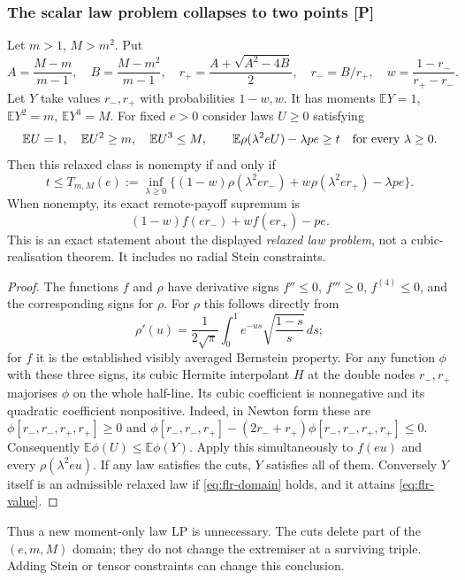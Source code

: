 \subsubsection{The scalar law problem collapses to two points [P]}
Let $m>1$, $M>m^2$. Put
\[
 A=\frac{M-m}{m-1},\quad B=\frac{M-m^2}{m-1},\quad
 r_+=\frac{A+\sqrt{A^2-4B}}2,\quad r_-=B/r_+,
 \quad w=\frac{1-r_-}{r_+-r_-}.
\]
Let $Y$ take values $r_-,r_+$ with probabilities $1-w,w$.
It has moments $\mathbb EY=1$, $\mathbb EY^2=m$, $\mathbb EY^3=M$.
For fixed $e>0$ consider laws $U\ge0$ satisfying
\[
 \mathbb EU=1,\quad\mathbb EU^2\ge m,\quad\mathbb EU^3\le M,
 \qquad \mathbb E\rho(\lambda^2eU)-\lambda pe\ge t
 \quad\hbox{for every }\lambda\ge0.
\]
Then this relaxed class is nonempty if and only if
\begin{equation}\label{eq:flr-domain}
 t\le T_{m,M}(e):=\inf_{\lambda\ge0}
 \{(1-w)\rho(\lambda^2er_-)+w\rho(\lambda^2er_+)-\lambda pe\}.
\end{equation}
When nonempty, its exact remote-payoff supremum is
\begin{equation}\label{eq:flr-value}
 (1-w)f(er_-)+wf(er_+)-pe.
\end{equation}
This is an exact statement about the displayed \emph{relaxed law problem},
not a cubic-realisation theorem. It includes no radial Stein constraints.

\begin{proof}
The functions $f$ and $\rho$ have derivative signs
$f''\le0$, $f'''\ge0$, $f^{(4)}\le0$, and the corresponding signs
for $\rho$. For $\rho$ this follows directly from
\[
 \rho'(u)=\frac1{2\sqrt\pi}\int_0^1e^{-us}
             \sqrt{\frac{1-s}{s}}\,ds;
\]
for $f$ it is the established visibly averaged Bernstein property.
For any function $\phi$ with these three signs, its cubic Hermite
interpolant $H$ at the double nodes $r_-,r_+$ majorises $\phi$ on
the whole half-line. Its cubic coefficient is nonnegative and its
quadratic coefficient nonpositive. Indeed, in Newton form these are
$\phi[r_-,r_-,r_+,r_+]\ge0$ and
$\phi[r_-,r_-,r_+]-(2r_-+r_+)\phi[r_-,r_-,r_+,r_+]\le0$.
Consequently $\mathbb E\phi(U)\le\mathbb E\phi(Y)$.
Apply this simultaneously to $f(eu)$ and every
$\rho(\lambda^2eu)$. If any law satisfies the cuts, $Y$ satisfies
all of them. Conversely $Y$ itself is an admissible relaxed law if
\eqref{eq:flr-domain} holds, and it attains \eqref{eq:flr-value}.
\end{proof}

Thus a new moment-only law LP is unnecessary. The cuts delete part of
the $(e,m,M)$ domain; they do not change the extremiser at a surviving
triple. Adding Stein or tensor constraints can change this conclusion.

